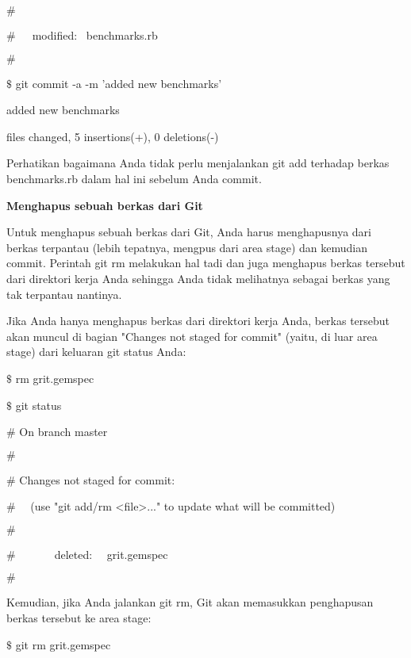 \noindent 
 $  \#  $ \par
\noindent 
 $  \#  $~~~modified:~  benchmarks.rb \par
\noindent 
 $  \#  $ \par
\noindent 
 $  \$  $ git commit -a -m 'added new benchmarks' \par
\noindent 
[master 83e38c7] added new benchmarks \par
{} files changed, 5 insertions(+), 0 deletions(-) \par
\vspace{12pt}
\noindent 
Perhatikan bagaimana Anda tidak perlu menjalankan git add terhadap berkas benchmarks.rb dalam hal ini sebelum Anda commit. \par
\noindent 
\textbf{M}\textbf{enghapus sebuah berkas dari Git} \par
\noindent 
Untuk menghapus sebuah berkas dari Git, Anda harus menghapusnya dari berkas terpantau (lebih tepatnya, mengpus dari area stage) dan kemudian commit. Perintah git rm melakukan hal tadi dan juga menghapus berkas tersebut dari direktori kerja Anda sehingga Anda tidak melihatnya sebagai berkas yang tak terpantau nantinya. \par
\noindent 
Jika Anda hanya menghapus berkas dari direktori kerja Anda, berkas tersebut akan muncul di bagian "Changes not staged for commit" (yaitu, di luar area stage) dari keluaran git status Anda: \par
\noindent 
 $  \$  $ rm grit.gemspec \par
\noindent 
 $  \$  $ git status \par
\noindent 
 $  \#  $ On branch master \par
\noindent 
 $  \#  $ \par
\noindent 
 $  \#  $ Changes not staged for commit: \par
\noindent 
 $  \#  $~~ (use "git add/rm <file>..." to update what will be committed) \par
\noindent 
 $  \#  $ \par
\noindent 
 $  \#  $~~~~~~~deleted:~~  grit.gemspec \par
\noindent 
 $  \#  $ \par
\vspace{12pt}
\vspace{12pt}
\noindent 
Kemudian, jika Anda jalankan git rm, Git akan memasukkan penghapusan berkas tersebut ke area stage: \par
\vspace{12pt}
\noindent 
 $  \$  $ git rm grit.gemspec \par
